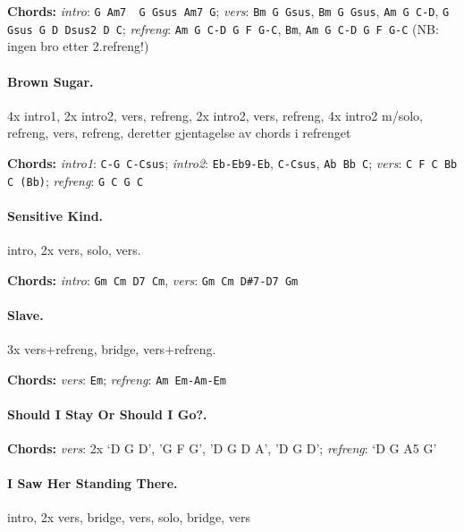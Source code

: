 \documentclass[%
twoside,                 %
final,                   %
10pt]{article}
\begin{document}
\textbf{Chords:} \emph{intro}: \Verb!G Am7  G Gsus Am7 G!;
\emph{vers}: \Verb!Bm G Gsus!, \Verb!Bm G Gsus!, \Verb!Am G C-D!, \Verb!G Gsus G D Dsus2 D C!;
\emph{refreng}: \Verb!Am G C-D G F G-C!, \Verb!Bm!, \Verb!Am G C-D G F G-C!
(NB: ingen bro etter 2.refreng!)





\paragraph{Brown Sugar.}
4x intro1, 2x intro2, vers, refreng, 2x intro2, vers, refreng, 4x intro2 m/solo, refreng, vers, refreng, deretter gjentagelse av chords i refrenget

\textbf{Chords:} \emph{intro1}: \Verb!C-G C-Csus!; \emph{intro2}: \Verb!Eb-Eb9-Eb!, \Verb!C-Csus!, \Verb!Ab Bb C!;
\emph{vers}: \Verb!C F C Bb C (Bb)!; \emph{refreng}: \Verb!G C G C!




\paragraph{Sensitive Kind.}
intro, 2x vers, solo, vers.

\textbf{Chords:} \emph{intro}: \Verb!Gm Cm D7 Cm!, \emph{vers}: \Verb!Gm Cm D#7-D7 Gm!





\paragraph{Slave.}
3x vers+refreng, bridge, vers+refreng.

\textbf{Chords:} \emph{vers}: \Verb!Em!; \emph{refreng}: \Verb!Am Em-Am-Em!




\paragraph{Should I Stay Or Should I Go?.}
\textbf{Chords:} \emph{vers}: 2x `D G D', 'G F G', 'D G D A', 'D G D';
\emph{refreng}: `D G A5 G'





\paragraph{I Saw Her Standing There.}
intro, 2x vers, bridge, vers, solo, bridge, vers
\end{document}
